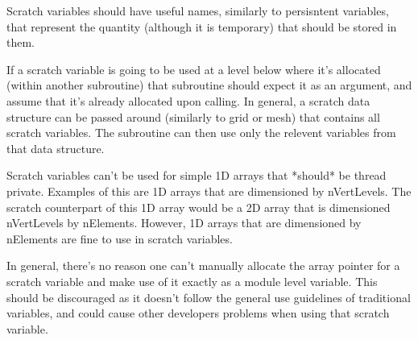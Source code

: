 \documentclass[11pt]{report}
\begin{document}
Scratch variables should have useful names, similarly to persisntent variables,
that represent the quantity (although it is temporary) that should be stored in
them.

If a scratch variable is going to be used at a level below where it's allocated
(within another subroutine) that subroutine should expect it as an argument,
and assume that it's already allocated upon calling. In general, a scratch data
structure can be passed around (similarly to grid or mesh) that contains all
scratch variables. The subroutine can then use only the relevent variables from
that data structure.

Scratch variables can't be used for simple 1D arrays that *should* be thread
private. Examples of this are 1D arrays that are dimensioned by nVertLevels.
The scratch counterpart of this 1D array would be a 2D array that is
dimensioned nVertLevels by nElements. However, 1D arrays that are dimensioned
by nElements are fine to use in scratch variables.

In general, there's no reason one can't manually allocate the array pointer for
a scratch variable and make use of it exactly as a module level variable. This
should be discouraged as it doesn't follow the general use guidelines of
traditional variables, and could cause other developers problems when using
that scratch variable.
\end{document}
